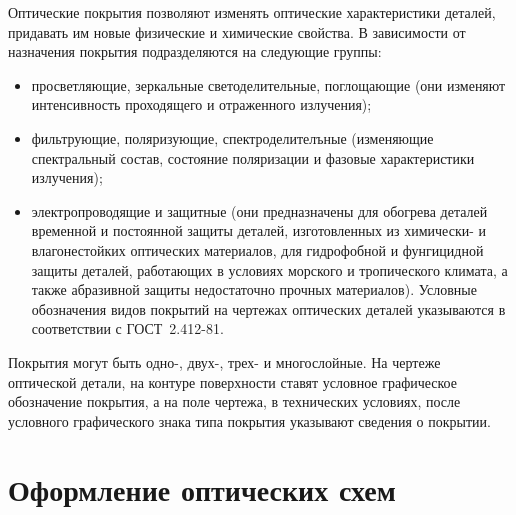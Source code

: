 \begin{enumerate}
	Оптические покрытия позволяют изменять оптические характеристики деталей, придавать им новые физические и химические свойства. В зависимости от назначения покрытия подразделяются на следующие группы:
	\begin{itemize}
		\item просветляющие, зеркальные светоделительные, поглощающие (они изменяют интенсивность проходящего и отраженного излучения);
		\item фильтрующие, поляризующие, спектроделителъные (изменяющие спектральный состав, состояние поляризации и фазовые характеристики излучения);
		\item электропроводящие и защитные (они предназначены для обогрева деталей временной и постоянной защиты деталей, изготовленных из химически- и влагонестойких оптических материалов, для гидрофобной и фунгицидной защиты деталей, работающих в условиях морского и тропического климата, а также абразивной защиты недостаточно прочных материалов). Условные обозначения видов покрытий на чертежах оптических деталей указываются в соответствии с ГОСТ~2.412-81. 
	\end{itemize}
	
	Покрытия могут быть одно-, двух-, трех- и многослойные. На чертеже оптической детали, на контуре поверхности ставят условное графическое обозначение покрытия, а на поле чертежа, в технических условиях, после условного графического знака типа покрытия указывают сведения о покрытии.
	
\end{enumerate}

\section{Оформление оптических схем}


